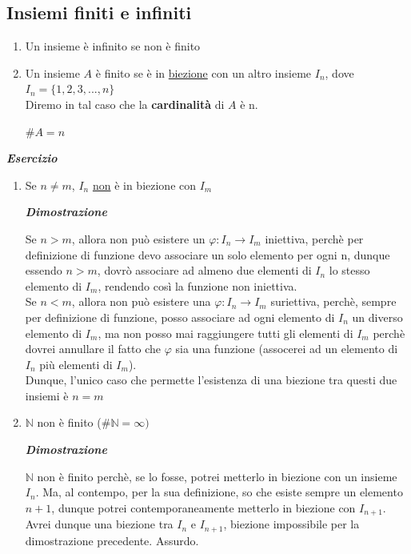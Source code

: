 \documentclass{article}
\theoremstyle{definition}
\newcommand{\N}{\mathbb{N}}
\begin{document}
\subsection{Insiemi finiti e infiniti}
\begin{enumerate}
    \item Un insieme è infinito se non è finito
    \item Un insieme $A$ è finito se è in \underline{biezione} con un altro insieme $I_n$, dove $I_n=\{1,2,3,...,n\}$
    \\ Diremo in tal caso che la \textbf{cardinalità} di $A$ è n.
    \begin{center}
        $\#A=n$
    \end{center}
\end{enumerate}
\begin{center}
    \textbf{\textit{Esercizio}}
\end{center}
\begin{enumerate}
    \item Se $n \neq m$, $I_n$ \underline{non} è in biezione con $I_m$
    \begin{center}
        \textbf{\textit{Dimostrazione}}
    \end{center}
    Se $n>m$, allora non può esistere un $\varphi : I_n \to I_m$ iniettiva, perchè per definizione di funzione devo associare un solo elemento per ogni n, dunque essendo $n>m$, dovrò associare ad almeno due elementi di $I_n$ lo stesso elemento di $I_m$, rendendo così la funzione non iniettiva.
    \\
    Se $n<m$, allora non può esistere una $\varphi: I_n \to I_m$ suriettiva, perchè, sempre per definizione di funzione, posso associare ad ogni elemento di $I_n$ un diverso elemento di $I_m$, ma non posso mai raggiungere tutti gli elementi di $I_m$ perchè dovrei annullare il fatto che $\varphi$ sia una funzione (assocerei ad un elemento di $I_n$ più elementi di $I_m$).
    \\
    Dunque, l'unico caso che permette l'esistenza di una biezione tra questi due insiemi è $n=m$
    \item $\mathbb{N}$ non è finito ($\#\mathbb{N}= \infty)$
    \begin{center}
        \textbf{\textit{Dimostrazione}}
    \end{center}
    $\N$ non è finito perchè, se lo fosse, potrei metterlo in biezione con un insieme $I_n$. Ma, al contempo, per la sua definizione, so che esiste sempre un elemento $n+1$, dunque potrei contemporaneamente metterlo in biezione con $I_{n+1}$.
    \\
    Avrei dunque una biezione tra $I_n$ e $I_{n+1}$, biezione impossibile per la dimostrazione precedente. Assurdo.
\end{enumerate}
\end{document}

